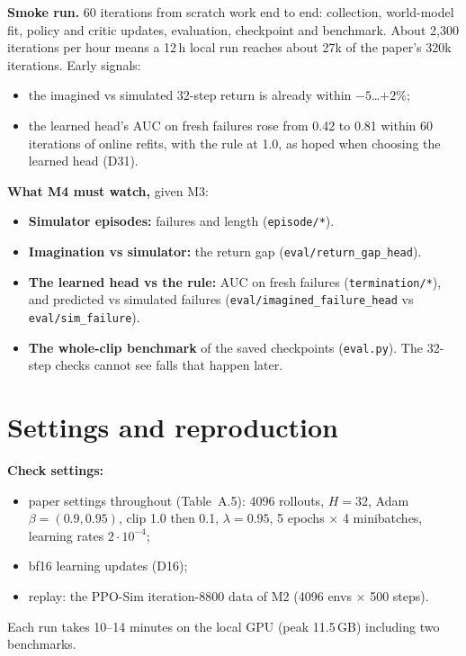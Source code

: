 \documentclass[10pt]{article}
\begin{document}
\begin{table}[H]
\centering\small
\caption{Local smoke run of the M4 task from scratch (RTX 5060 Ti, \texttt{dev}, bf16, replay 500,
60 iterations).}
\label{tab:smoke}

\end{table}

\textbf{Smoke run.} 60 iterations from scratch work end to end: collection, world-model fit, policy
and critic updates, evaluation, checkpoint and benchmark. About 2,300 iterations per hour means a
12\,h local run reaches about 27k of the paper's 320k iterations. Early signals:
\begin{itemize}
  \item the imagined vs simulated 32-step return is already within $-5$\ldots$+2\%$;
  \item the learned head's AUC on fresh failures rose from 0.42 to 0.81 within 60 iterations of
  online refits, with the rule at 1.0, as hoped when choosing the learned head (D31).
\end{itemize}

\textbf{What M4 must watch,} given M3:
\begin{itemize}
  \item \textbf{Simulator episodes:} failures and length (\texttt{episode/*}).
  \item \textbf{Imagination vs simulator:} the return gap (\texttt{eval/return\_gap\_head}).
  \item \textbf{The learned head vs the rule:} AUC on fresh failures (\texttt{termination/*}), and
  predicted vs simulated failures (\texttt{eval/imagined\_failure\_head} vs
  \texttt{eval/sim\_failure}).
  \item \textbf{The whole-clip benchmark} of the saved checkpoints (\texttt{eval.py}). The 32-step
  checks cannot see falls that happen later.
\end{itemize}

\appendix
\section{Settings and reproduction}

\textbf{Check settings:}
\begin{itemize}
  \item paper settings throughout (Table~A.5): 4096 rollouts, $H = 32$, Adam $\beta = (0.9, 0.95)$,
  clip 1.0 then 0.1, $\lambda = 0.95$, 5 epochs $\times$ 4 minibatches, learning rates
  $2\cdot10^{-4}$;
  \item bf16 learning updates (D16);
  \item replay: the PPO-Sim iteration-8800 data of M2 (4096 envs $\times$ 500 steps).
\end{itemize}
Each run takes 10--14 minutes on the local GPU (peak 11.5\,GB) including two benchmarks.
\end{document}
